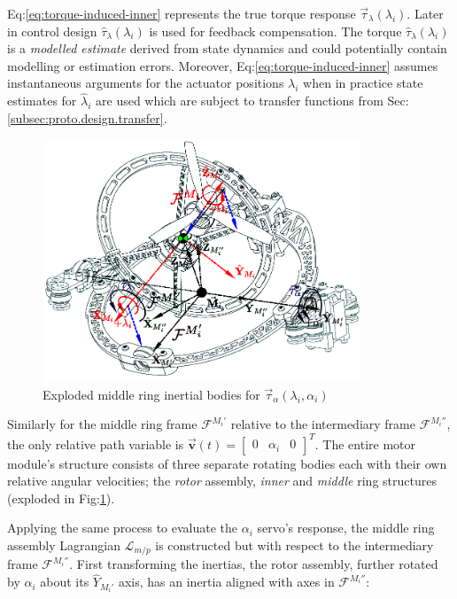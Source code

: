 Eq:\ref{eq:torque-induced-inner} represents the true torque response $\vec{\tau}_\lambda(\lambda_i)$. Later in control design $\hat{\tau}_\lambda(\lambda_i)$ is used for feedback compensation. The torque $\hat{\tau}_\lambda(\lambda_i)$ is a \emph{modelled estimate} derived from state dynamics and could potentially contain modelling or estimation errors. Moreover, Eq:\ref{eq:torque-induced-inner} assumes instantaneous arguments for the actuator positions $\lambda_i$ when in practice state estimates for $\hat{\lambda}_i$ are used which are subject to transfer functions from Sec:\ref{subsec:proto.design.transfer}.
\begin{figure}[htbp]
\vspace{-10pt}
\centering
\includegraphics[width=0.85\textwidth]{figs/response-middle}
\vspace{-12pt}
\caption{Exploded middle ring inertial bodies for $\vec{\tau}_{\alpha}(\lambda_i,\alpha_i)$}
\label{fig:response-middle}
\vspace{-16pt}
\end{figure}
\par
Similarly for the middle ring frame $\mathcal{F}^{M_i'}$ relative to the intermediary frame $\mathcal{F}^{M_i''}$, the only relative path variable is $\vec{\mathbf{v}}(t)=\begin{bmatrix}0 & \alpha_i & 0\end{bmatrix}^T$. The entire motor module's structure consists of three separate rotating bodies each with their own relative angular velocities; the \emph{rotor} assembly, \emph{inner} and \emph{middle} ring structures (exploded in Fig:\ref{fig:response-middle}). 
\par
Applying the same process to evaluate the $ \alpha_i$ servo's response, the middle ring assembly Lagrangian $\mathcal{L}_{m/p}$ is constructed but with respect to the intermediary frame $\mathcal{F}^{M_i''}$. First transforming the inertias, the rotor assembly, further rotated by $\alpha_i$ about its $\hat{Y}_{M_i'}$ axis, has an inertia aligned with axes in $\mathcal{F}^{M_i''}$:

